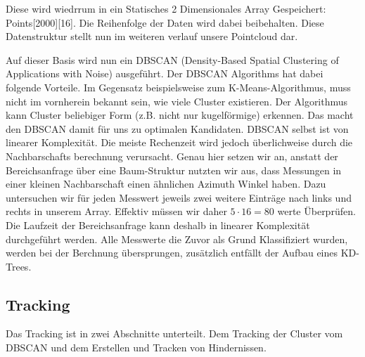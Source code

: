 \documentclass[11pt,oneside,openright]{mpreport}
\begin{document}
\begin{center}
\end{center}

Diese wird wiedrrum in ein Statisches 2 Dimensionales Array Gespeichert: Points[2000][16]. Die Reihenfolge der Daten wird dabei beibehalten.
Diese Datenstruktur stellt nun im weiteren verlauf unsere Pointcloud dar.

Auf dieser Basis wird nun ein DBSCAN (Density-Based Spatial Clustering of Applications with Noise) \cite{DBSCAN} ausgeführt. Der DBSCAN Algorithms hat dabei folgende Vorteile.
Im Gegensatz beispielsweise zum K-Means-Algorithmus, muss nicht im vornherein bekannt sein, wie viele Cluster existieren. Der Algorithmus kann Cluster beliebiger Form 
(z.B. nicht nur kugelförmige) erkennen. Das macht den DBSCAN damit für uns zu optimalen Kandidaten. DBSCAN selbst ist von linearer Komplexität.
Die meiste Rechenzeit wird jedoch überlichweise durch die Nachbarschafts berechnung verursacht. Genau hier setzen wir an, anstatt der Bereichsanfrage über eine Baum-Struktur
nutzten wir aus, dass Messungen in einer kleinen Nachbarschaft einen ähnlichen Azimuth Winkel haben. Dazu untersuchen wir für jeden Messwert jeweils zwei weitere Einträge nach links
und rechts in unserem Array. Effektiv müssen wir daher $5 \cdot 16 = 80$ werte Überprüfen. Die Laufzeit der Bereichsanfrage kann deshalb in linearer Komplexität durchgeführt
werden. Alle Messwerte die Zuvor als Grund Klassifiziert wurden, werden bei der Berchnung übersprungen, zusätzlich entfällt der Aufbau eines KD-Trees. 


\subsection{Tracking}
Das Tracking ist in zwei Abschnitte unterteilt. Dem Tracking der Cluster vom DBSCAN und dem Erstellen und Tracken von Hindernissen.
\end{document}
